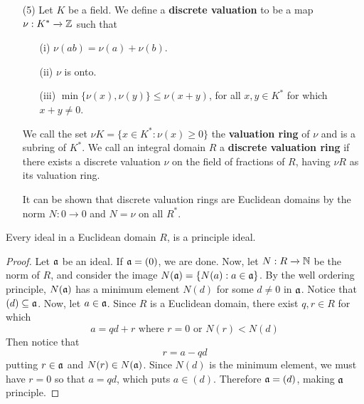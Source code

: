 \begin{example}
\begin{enumerate}
    \item[(5)] Let $K$ be a field. We define a  \textbf{discrete valuation}
      to be a map $\nu:K^\ast \xrightarrow{} \mathbb{Z}$ such that
      \begin{enumerate}
        \item[(i)] $\nu(ab)=\nu(a)+\nu(b)$.

        \item[(ii)] $\nu$ is onto.

        \item[(iii)] $\min{\{\nu(x),\nu(y)\}} \leq \nu(x+y)$, for all
          $x,y \in K^\ast$ for which  $x+y \neq 0$.
      \end{enumerate}
      We call the set $\nu{K}=\{x \in K^\ast : \nu(x) \geq 0\}$ the
      \textbf{valuation ring} of $\nu$ and is a subring of  $K^\ast$. We
      call an integral domain  $R$ a  \textbf{discrete valuation ring} if
      there exists a discrete valuation $\nu$ on the field of fractions of
      $R$, having  $\nu{R}$ as its valuation ring.

      It can be shown that discrete valuation rings are Euclidean
      domains by the norm $N:0 \xrightarrow{} 0$ and $N=\nu$ on all
      $R^\ast$.
  \end{enumerate}
\end{example}

\begin{lemma}\label{lemma_6.1.1}
  Every ideal in a Euclidean domain $R$, is a principle ideal.
\end{lemma}
\begin{proof}
  Let $\mathfrak{a}$ be an ideal. If $\mathfrak{a}=(0)$, we are done. Now, let $N:R \xrightarrow{}
  \mathbb{N}$ be the norm of $R$, and consider the image $N(\mathfrak{a})=\{N(a) : a \in \mathfrak{a}\}$. By
  the well ordering principle, $N(\mathfrak{a})$ has a minimum element $N(d)$ for some
  $d \neq 0$ in $\mathfrak{a}$. Notice that  $(d) \subseteq \mathfrak{a}$. Now, let $a \in \mathfrak{a}$.
  Since $R$ is a Euclidean domain, there exist $q,r \in R$ for which
  \begin{equation*}
    a=qd+r \text{ where } r=0 \text{ or } N(r)<N(d)
  \end{equation*}
  Then notice that
  \begin{equation*}
    r=a-qd
  \end{equation*}
  putting $r \in \mathfrak{a}$ and  $N(r) \in N(\mathfrak{a})$. Since $N(d)$ is the minimum element,
  we must have $r=0$ so that  $a=qd$, which puts  $a \in (d)$. Therefore
  $\mathfrak{a}=(d)$, making $\mathfrak{a}$ principle.
\end{proof}

